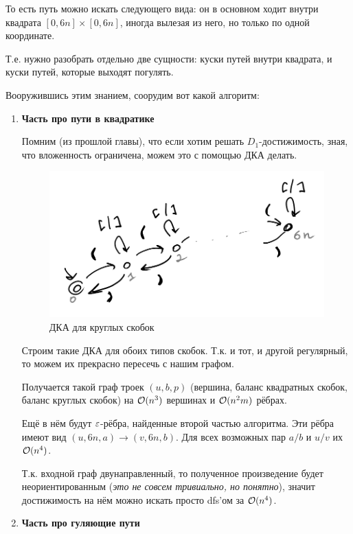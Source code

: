 \begin{note}
    То есть путь можно искать следующего вида: он в основном ходит внутри квадрата $[0, 6n] \times [0, 6n]$, иногда вылезая из него, но только по одной координате.

    Т.е. нужно разобрать отдельно две сущности: куски путей внутри квадрата, и куски путей, которые выходят погулять.
\end{note}

Вооружившись этим знанием, соорудим вот какой алгоритм:

\begin{enumerate}
    \item {\bf Часть про пути в квадратике}

    Помним (из прошлой главы), что если хотим решать $D_1$-достижимость, зная, что вложенность ограничена, можем это с помощью ДКА делать.

    \begin{figure}[H]
        \includegraphics[width=0.75\linewidth]{img/dyck_1_1_dfa.png}
        \caption{ДКА для круглых скобок}
    \end{figure}

    Строим такие ДКА для обоих типов скобок. Т.к. и тот, и другой регулярный, то можем их прекрасно пересечь с нашим графом. 

    Получается такой граф троек $(u, b, p)$ (вершина, баланс квадратных скобок, баланс круглых скобок) на $\mathcal{O}(n^3)$ вершинах и $\mathcal{O}(n^2 m)$ рёбрах.

    Ещё в нём будут $\varepsilon$-рёбра, найденные второй частью алгоритма. Эти рёбра имеют вид $(u, 6n, a) \to (v, 6n, b)$. Для всех возможных пар $a/b$ и $u/v$ их $\mathcal{O}(n^4)$.

    Т.к. входной граф двунаправленный, то полученное произведение будет неориентированным (\textit{это не совсем тривиально, но понятно}), значит достижимость на нём можно искать просто dfs'ом за $\mathcal{O}(n^4)$.

    \item {\bf Часть про гуляющие пути}


\end{enumerate}
